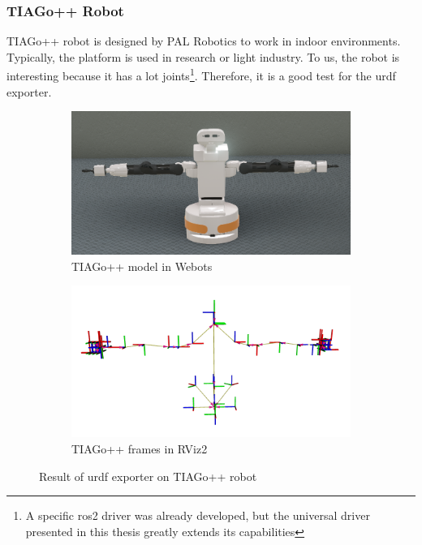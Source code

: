 \subsubsection{TIAGo++ Robot}

TIAGo++ robot is designed by PAL Robotics to work in indoor environments.
Typically, the platform is used in research or light industry. 
To us, the robot is interesting because it has a lot joints\footnote{A specific \ac{ros2} driver was already developed, but the universal driver presented in this thesis greatly extends its capabilities}.
Therefore, it is a good test for the \ac{urdf} exporter.

\begin{figure}[H]
\centering
\begin{subfigure}{1\textwidth}
  \centering
  \includegraphics[width=\linewidth]{results/figures/tiago_webots.png}
  \caption{TIAGo++ model in Webots}
  \label{fig:results:map:webots}
\end{subfigure}
\begin{subfigure}{1\textwidth}
  \centering
  \includegraphics[width=\linewidth]{results/figures/tiago_frames.png}
  \caption{TIAGo++ frames in RViz2}
  \label{fig:results:tiago:frames}
\end{subfigure}
\caption{Result of \ac{urdf} exporter on TIAGo++ robot}
\label{fig:results:tiago}
\end{figure}

